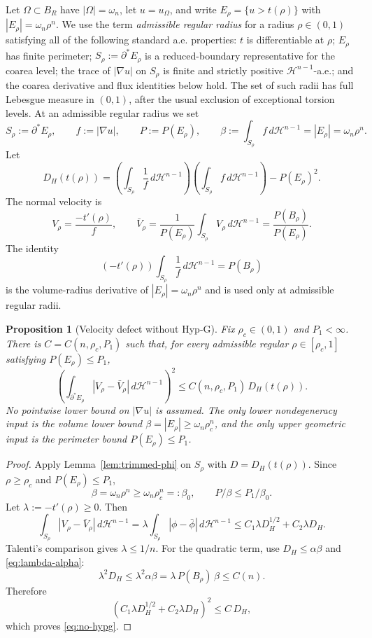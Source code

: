 \documentclass[11pt]{article}
\newtheorem{proposition}[theorem]{Proposition}
\theoremstyle{definition}
\newcommand{\Om}{\Omega}
\newcommand{\Hn}{\mathcal H^{n-1}}
\begin{document}
Let $\Om\subset B_R$ have $|\Om|=\omega_n$, let $u=u_\Om$, and write
$E_\rho=\{u>t(\rho)\}$ with $|E_\rho|=\omega_n\rho^n$.
We use the term \emph{admissible regular radius} for a radius
$\rho\in(0,1)$ satisfying all of the following standard a.e. properties:
$t$ is differentiable at $\rho$; $E_\rho$ has finite perimeter;
$S_\rho:=\partial^*E_\rho$ is a reduced-boundary representative for the
coarea level; the trace of $|\nabla u|$ on $S_\rho$ is finite and
strictly positive $\Hn$-a.e.; and the coarea derivative and flux
identities below hold.  The set of such radii has full Lebesgue measure
in $(0,1)$, after the usual exclusion of exceptional torsion levels.
At an admissible regular radius we set
\[
   S_\rho:=\partial^*E_\rho,\qquad
   f:=|\nabla u|,\qquad
   P:=P(E_\rho),\qquad
   \beta:=\int_{S_\rho}f\,d\Hn=|E_\rho|=\omega_n\rho^n.
\]
Let
\[
   D_H(t(\rho))
   =\left(\int_{S_\rho}\frac1f\,d\Hn\right)
      \left(\int_{S_\rho}f\,d\Hn\right)-P(E_\rho)^2.
\]
The normal velocity is
\[
   V_\rho=\frac{-t'(\rho)}{f},
   \qquad
   \bar V_\rho=\frac{1}{P(E_\rho)}\int_{S_\rho}V_\rho\,d\Hn
              =\frac{P(B_\rho)}{P(E_\rho)}.
\]
The identity
\begin{equation}\label{eq:lambda-alpha}
   (-t'(\rho))\int_{S_\rho}\frac1f\,d\Hn=P(B_\rho)
\end{equation}
is the volume-radius derivative of $|E_\rho|=\omega_n\rho^n$ and is used
only at admissible regular radii.

\begin{proposition}[Velocity defect without Hyp-G]\label{prop:no-hypg}
Fix $\rho_c\in(0,1)$ and $P_1<\infty$.  There is
$C=C(n,\rho_c,P_1)$ such that, for every admissible regular
$\rho\in[\rho_c,1]$ satisfying $P(E_\rho)\le P_1$,
\begin{equation}\label{eq:no-hypg}
   \left(\int_{\partial^*E_\rho}
      |V_\rho-\bar V_\rho|\,d\Hn\right)^2
   \le C(n,\rho_c,P_1)\,D_H(t(\rho)).
\end{equation}
No pointwise lower bound on $|\nabla u|$ is assumed.  The only lower
nondegeneracy input is the volume lower bound
$\beta=|E_\rho|\ge\omega_n\rho_c^n$, and the only upper geometric input
is the perimeter bound $P(E_\rho)\le P_1$.
\end{proposition}

\begin{proof}
Apply Lemma~\ref{lem:trimmed-phi} on $S_\rho$ with
$D=D_H(t(\rho))$.  Since $\rho\ge\rho_c$ and $P(E_\rho)\le P_1$,
\[
   \beta=\omega_n\rho^n\ge\omega_n\rho_c^n=:\beta_0,
   \qquad P/\beta\le P_1/\beta_0 .
\]
Let $\lambda:=-t'(\rho)\ge0$.  Then
\[
   \int_{S_\rho}|V_\rho-\bar V_\rho|\,d\Hn
   =\lambda\int_{S_\rho}|\phi-\bar\phi|\,d\Hn
   \le C_1\lambda D_H^{1/2}+C_2\lambda D_H .
\]
Talenti's comparison gives $\lambda\le1/n$.  For the quadratic term,
use $D_H\le\alpha\beta$ and \eqref{eq:lambda-alpha}:
\[
   \lambda^2D_H
   \le \lambda^2\alpha\beta
   =\lambda\,P(B_\rho)\,\beta
   \le C(n).
\]
Therefore
\[
   \left(C_1\lambda D_H^{1/2}+C_2\lambda D_H\right)^2
   \le C\,D_H,
\]
which proves \eqref{eq:no-hypg}.
\end{proof}
\end{document}
